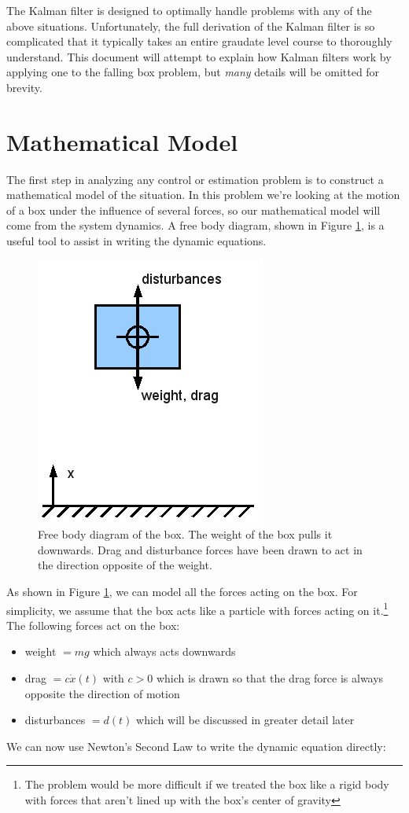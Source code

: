 \documentclass{article}
\begin{document}
The Kalman filter is designed to optimally handle problems with any of the above situations.  Unfortunately, the full derivation of the Kalman filter is so complicated that it typically takes an entire graudate level course to thoroughly understand.  This document will attempt to explain how Kalman filters work by applying one to the falling box problem, but \emph{many} details will be omitted for brevity.  


\section{Mathematical Model}
\label{sec:mathModel}

The first step in analyzing any control or estimation problem is to construct a mathematical model of the situation.  In this problem we're looking at the motion of a box under the influence of several forces, so our mathematical model will come from the system dynamics.  A free body diagram, shown in Figure \ref{fig:boxFreeBodyDiagram}, is a useful tool to assist in writing the dynamic equations.

\begin{figure}[h]
\includegraphics[scale=0.25]{boxFreeBodyDiagram.png}
\centering
\caption{Free body diagram of the box.  The weight of the box pulls it downwards.  Drag and disturbance forces have been drawn to act in the direction opposite of the weight. }
\label{fig:boxFreeBodyDiagram}
\end{figure}

As shown in Figure \ref{fig:boxFreeBodyDiagram}, we can model all the forces acting on the box.  For simplicity, we assume that the box acts like a particle with forces acting on it.\footnote{The problem would be more difficult if we treated the box like a rigid body with forces that aren't lined up with the box's center of gravity}  The following forces act on the box:
\begin{itemize}
\item weight $=mg$ which always acts downwards
\item drag $=c\dot{x}(t)$ with $c>0$ which is drawn so that the drag force is always opposite the direction of motion
\item disturbances $=d(t)$ which will be discussed in greater detail later 
\end{itemize}
We can now use Newton's Second Law to write the dynamic equation directly:
\end{document}
